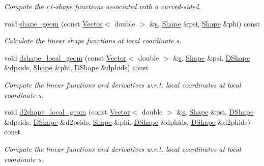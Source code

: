 \begin{DoxyCompactItemize}
\begin{DoxyCompactList}\small\item\em Compute the c1-\/shape functions associated with a curved-\/sided. \end{DoxyCompactList}\item 
void \hyperlink{classoomph_1_1C1CurvedElement_3_012_00_01NNODE__1D_01_4_ab90480a9e420ce7507931376fca7dbba}{shape\+\_\+geom} (const \hyperlink{classoomph_1_1Vector}{Vector}$<$ double $>$ \&\hyperlink{cfortran_8h_ab7123126e4885ef647dd9c6e3807a21c}{s}, \hyperlink{classoomph_1_1Shape}{Shape} \&psi, \hyperlink{classoomph_1_1Shape}{Shape} \&phi) const
\begin{DoxyCompactList}\small\item\em Calculate the linear shape functions at local coordinate s. \end{DoxyCompactList}\item 
void \hyperlink{classoomph_1_1C1CurvedElement_3_012_00_01NNODE__1D_01_4_ad7457d81744bbb7596ce70f7d1b576ce}{dshape\+\_\+local\+\_\+geom} (const \hyperlink{classoomph_1_1Vector}{Vector}$<$ double $>$ \&\hyperlink{cfortran_8h_ab7123126e4885ef647dd9c6e3807a21c}{s}, \hyperlink{classoomph_1_1Shape}{Shape} \&psi, \hyperlink{classoomph_1_1DShape}{D\+Shape} \&dpsids, \hyperlink{classoomph_1_1Shape}{Shape} \&phi, \hyperlink{classoomph_1_1DShape}{D\+Shape} \&dphids) const
\begin{DoxyCompactList}\small\item\em Compute the linear functions and derivatives w.\+r.\+t. local coordinates at local coordinate s. \end{DoxyCompactList}\item 
void \hyperlink{classoomph_1_1C1CurvedElement_3_012_00_01NNODE__1D_01_4_a075b64b7a480cf9839ae308764c5f355}{d2shape\+\_\+local\+\_\+geom} (const \hyperlink{classoomph_1_1Vector}{Vector}$<$ double $>$ \&\hyperlink{cfortran_8h_ab7123126e4885ef647dd9c6e3807a21c}{s}, \hyperlink{classoomph_1_1Shape}{Shape} \&psi, \hyperlink{classoomph_1_1DShape}{D\+Shape} \&dpsids, \hyperlink{classoomph_1_1DShape}{D\+Shape} \&d2psids, \hyperlink{classoomph_1_1Shape}{Shape} \&phi, \hyperlink{classoomph_1_1DShape}{D\+Shape} \&dphids, \hyperlink{classoomph_1_1DShape}{D\+Shape} \&d2phids) const
\begin{DoxyCompactList}\small\item\em Compute the linear functions and derivatives w.\+r.\+t. local coordinates at local coordinate s. \end{DoxyCompactList}\item 

\end{DoxyCompactItemize}
